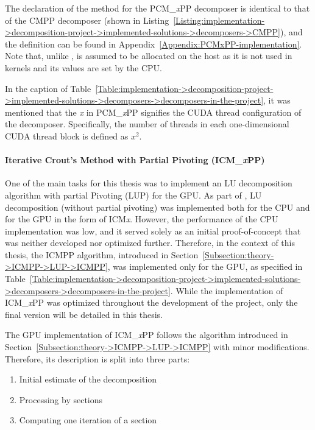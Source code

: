 The declaration of the  method for the PCM\_\textit{x}PP decomposer is identical to that of the CMPP decomposer (shown in Listing~\ref{Listing:implementation->decomposition-project->implemented-solutions->decomposers->CMPP}), and the definition can be found in Appendix~\ref{Appendix:PCMxPP-implementation}.
Note that, unlike ,  is assumed to be allocated on the host as it is not used in kernels and its values are set by the CPU.

In the caption of Table~\ref{Table:implementation->decomposition-project->implemented-solutions->decomposers->decomposers-in-the-project}, it was mentioned that the \textit{x} in PCM\_\textit{x}PP signifies the CUDA thread configuration of the decomposer.
Specifically, the number of threads in each one-dimensional CUDA thread block is defined as $x^2$.

\paragraph{Iterative Crout's Method with Partial Pivoting (ICM\_\textit{x}PP)} \label{Paragraph:implementation->decomposition-project->implemented-solutions->decomposers->ICMxPP}
One of the main tasks for this thesis was to implement an LU decomposition algorithm with partial Pivoting (LUP) for the GPU.
As part of  \cite{Cejka2022}, LU decomposition (without partial pivoting) was implemented both for the CPU and for the GPU in the form of ICM\textit{x}.
However, the performance of the CPU implementation was low, and it served solely as an initial proof-of-concept that was neither developed nor optimized further.
Therefore, in the context of this thesis, the ICMPP algorithm, introduced in Section~\ref{Subsection:theory->ICMPP->LUP->ICMPP}, was implemented only for the GPU, as specified in Table~\ref{Table:implementation->decomposition-project->implemented-solutions->decomposers->decomposers-in-the-project}.
While the implementation of ICM\_\textit{x}PP was optimized throughout the development of the project, only the final version will be detailed in this thesis.

The GPU implementation of ICM\_\textit{x}PP follows the algorithm introduced in Section~\ref{Subsection:theory->ICMPP->LUP->ICMPP} with minor modifications.
Therefore, its description is split into three parts:

\begin{enumerate}
	\item Initial estimate of the decomposition
	\item Processing by sections
	\item Computing one iteration of a section
\end{enumerate}

